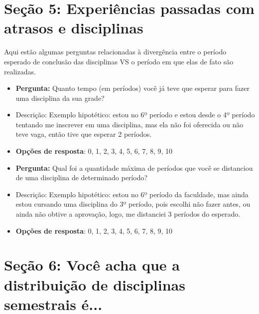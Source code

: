 \begin{apendicesenv}
  \section*{Seção 5: Experiências passadas com atrasos e disciplinas}

  Aqui estão algumas perguntas relacionadas à divergência entre o período esperado de conclusão das disciplinas VS o período em que elas de fato são realizadas.

  \begin{itemize}
    \item \textbf{Pergunta:} Quanto tempo (em períodos) você já teve que esperar para fazer uma disciplina da sua grade?
    \item Descrição: Exemplo hipotético: estou no 6º período e estou desde o 4º período tentando me inscrever em uma disciplina, mas ela não foi oferecida ou não teve vaga, então tive que esperar 2 períodos.
    \item \textbf{Opções de resposta}: 0, 1, 2, 3, 4, 5, 6, 7, 8, 9, 10
  \end{itemize}

  \begin{itemize}
    \item \textbf{Pergunta:} Qual foi a quantidade máxima de períodos que você se distanciou de uma disciplina de determinado período?
    \item Descrição: Exemplo hipotético: estou no 6º período da faculdade, mas ainda estou cursando uma disciplina do 3º período, pois escolhi não fazer antes, ou ainda não obtive a aprovação, logo, me distanciei 3 períodos do esperado.
    \item \textbf{Opções de resposta}: 0, 1, 2, 3, 4, 5, 6, 7, 8, 9, 10
  \end{itemize}

  \section*{Seção 6: Você acha que a distribuição de disciplinas semestrais é...}


\end{apendicesenv}
